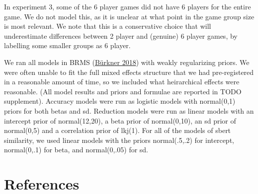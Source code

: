 \documentclass[
  english,
  a4paper,
]{article}
\begin{document}
In experiment 3, some of the 6 player games did not have 6 players for the entire game. We do not model this, as it is unclear at what point in the game group size is most relevant. We note that this is a conservative choice that will underestimate differences between 2 player and (genuine) 6 player games, by labelling some smaller groups as 6 player.

We ran all models in BRMS (\protect\hyperlink{ref-burkner2018}{Bürkner 2018}) with weakly regularizing priors. We were often unable to fit the full mixed effects structure that we had pre-registered in a reasonable amount of time, so we included what heirarchical effects were reasonable. (All model results and priors and formulae are reported in TODO supplement). Accuracy models were run as logistic models with normal(0,1) priors for both betas and sd. Reduction models were run as linear models with an intercept prior of normal(12,20), a beta prior of normal(0,10), an sd prior of normal(0,5) and a correlation prior of lkj(1). For all of the models of sbert similarity, we used linear models with the priors normal(.5,.2) for intercept, normal(0,.1) for beta, and normal(0,.05) for sd.

\hypertarget{references}{%
\section{References}\label{references}}

\setlength{\parindent}{-0.1in} 
\setlength{\leftskip}{0.125in}

\noindent
\end{document}
